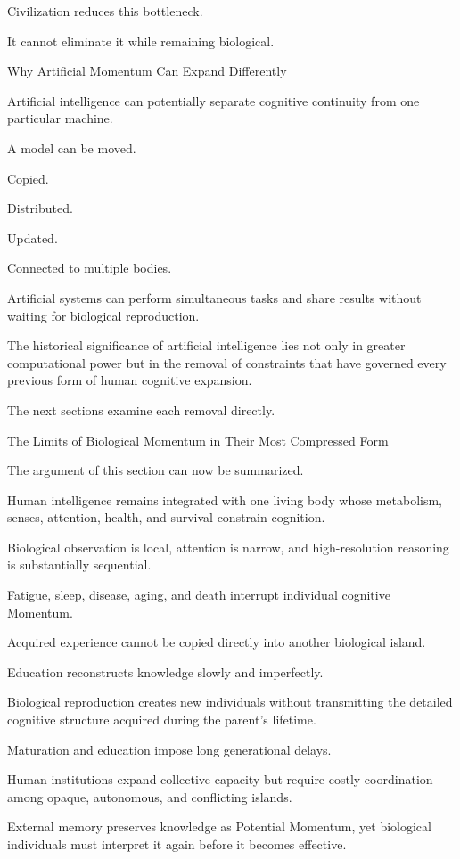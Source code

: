 Civilization reduces this bottleneck.

It cannot eliminate it while remaining biological.

Why Artificial Momentum Can Expand Differently

Artificial intelligence can potentially separate cognitive continuity from one particular machine.

A model can be moved.

Copied.

Distributed.

Updated.

Connected to multiple bodies.

Artificial systems can perform simultaneous tasks and share results without waiting for biological reproduction.

The historical significance of artificial intelligence lies not only in greater computational power but in the removal of constraints that have governed every previous form of human cognitive expansion.

The next sections examine each removal directly.

The Limits of Biological Momentum in Their Most Compressed Form

The argument of this section can now be summarized.

Human intelligence remains integrated with one living body whose metabolism, senses, attention, health, and survival constrain cognition.

Biological observation is local, attention is narrow, and high-resolution reasoning is substantially sequential.

Fatigue, sleep, disease, aging, and death interrupt individual cognitive Momentum.

Acquired experience cannot be copied directly into another biological island.

Education reconstructs knowledge slowly and imperfectly.

Biological reproduction creates new individuals without transmitting the detailed cognitive structure acquired during the parent’s lifetime.

Maturation and education impose long generational delays.

Human institutions expand collective capacity but require costly coordination among opaque, autonomous, and conflicting islands.

External memory preserves knowledge as Potential Momentum, yet biological individuals must interpret it again before it becomes effective.

